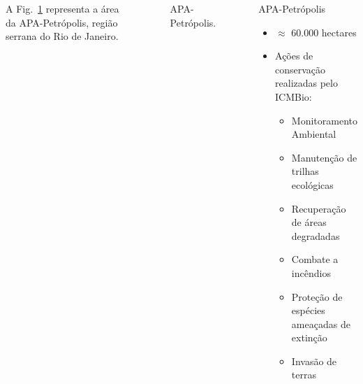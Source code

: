 \documentclass[%
  10pt,%
  aspectratio = 169,%
  compress,%
  t,%
  english,%
  brazilian,%
  tikz,
]{beamer}
\begin{document}
\begin{frame}
\begin{columns}[T]

A Fig.~\ref{fig:apa} representa a área da APA-Petrópolis, região serrana do Rio de Janeiro.
\begin{figure}[!htb]
\centering%
\caption{APA-Petrópolis.}%
\label{fig:apa}
\end{figure}
\begin{block}{APA-Petrópolis}
\begin{itemize}
\item $\approx$ 60.000 hectares
\item Ações de conservação realizadas pelo ICMBio:
\begin{itemize}
    \item Monitoramento Ambiental
    \item Manutenção de trilhas ecológicas
    \item Recuperação de áreas degradadas
    \item Combate a incêndios
    \item Proteção de espécies ameaçadas de extinção
    \item Invasão de terras
\end{itemize}
\end{itemize}
\end{block}
\end{columns}
\end{frame}
\end{document}
